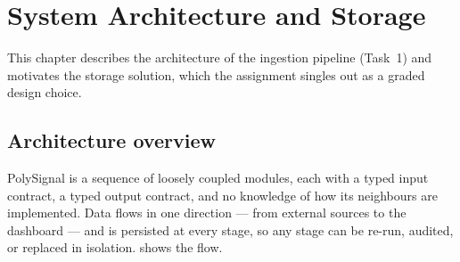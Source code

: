 
\chapter{System Architecture and Storage}
\label{ch:architecture}

This chapter describes the architecture of the ingestion pipeline (Task~1) and
motivates the storage solution, which the assignment singles out as a graded design
choice.

\section{Architecture overview}
PolySignal is a sequence of loosely coupled modules, each with a typed input
contract, a typed output contract, and no knowledge of how its neighbours are
implemented. Data flows in one direction --- from external sources to the dashboard
--- and is persisted at every stage, so any stage can be re-run, audited, or replaced
in isolation.  shows the flow.

